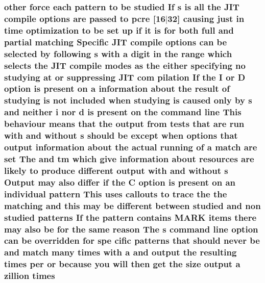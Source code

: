 \subsubsection[{\texorpdfstring{times}{times}}]{ other force each {\bf pattern} {\bf to} {\bf be} {\bf studied} If {\bf s} {\bf is} {\bf all} the J\+IT {\bf compile} {\bf options} {\bf are} passed {\bf to} {\bf pcre} \mbox{[}16$\vert$32\mbox{]} causing just {\bf in} {\bf time} optimization {\bf to} {\bf be} {\bf set} up {\bf if} {\bf it} {\bf is} for both full and {\bf partial} {\bf matching} Specific J\+IT {\bf compile} {\bf options} {\bf can} {\bf be} {\bf selected} by following {\bf s} {\bf with} {\bf a} digit {\bf in} the range {\bf which} selects the J\+IT {\bf compile} {\bf modes} {\bf as} the either {\bf specifying} no {\bf studying} at {\bf or} suppressing J\+IT com pilation If the {\bf I} {\bf or} {\bf D} {\bf option} {\bf is} {\bf present} {\bf on} {\bf a} information about the {\bf result} {\bf of} {\bf studying} {\bf is} {\bf not} {\bf included} when {\bf studying} {\bf is} caused only by {\bf s} and neither {\bf i} nor {\bf d} {\bf is} {\bf present} {\bf on} the {\bf command} {\bf line} This behaviour means that the {\bf output} {\bf from} {\bf tests} that {\bf are} {\bf run} {\bf with} and without {\bf s} should {\bf be} {\bf except} when {\bf options} that {\bf output} information about the actual running {\bf of} {\bf a} {\bf match} {\bf are} {\bf set} The and {\bf tm} {\bf which} give information about resources {\bf are} likely {\bf to} produce different {\bf output} {\bf with} and without {\bf s} Output may also differ {\bf if} the {\bf C} {\bf option} {\bf is} {\bf present} {\bf on} an individual {\bf pattern} This uses callouts {\bf to} trace the the {\bf matching} and {\bf this} may {\bf be} different between {\bf studied} and non {\bf studied} {\bf patterns} If the {\bf pattern} {\bf contains} M\+A\+RK items there may also {\bf be} for the same {\bf reason} The {\bf s} {\bf command} {\bf line} {\bf option} {\bf can} {\bf be} overridden for spe cific {\bf patterns} that should never {\bf be} and {\bf match} many times {\bf with} {\bf a} and {\bf output} the resulting times per {\bf or} because you will then get the {\bf size} {\bf output} {\bf a} zillion times}\hypertarget{pcretest_8txt_ac157d88382d9e91cae665985791a89b2}{}\label{pcretest_8txt_ac157d88382d9e91cae665985791a89b2}
